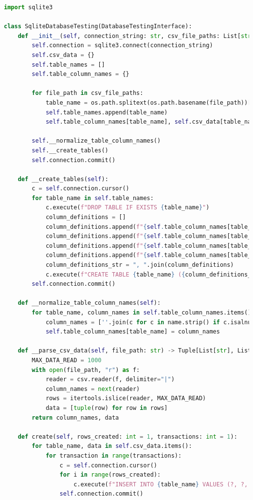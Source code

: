 \begin{lstlisting}[language=Python, caption=SQLiteDatabaseTesting]
import sqlite3

class SqliteDatabaseTesting(DatabaseTestingInterface):
    def __init__(self, connection_string: str, csv_file_paths: List[str]):
        self.connection = sqlite3.connect(connection_string)
        self.csv_data = {}
        self.table_names = []
        self.table_column_names = {}

        for file_path in csv_file_paths:
            table_name = os.path.splitext(os.path.basename(file_path))[0]
            self.table_names.append(table_name)
            self.table_column_names[table_name], self.csv_data[table_name] = self.__parse_csv_data(file_path)

        self.__normalize_table_column_names()
        self.__create_tables()
        self.connection.commit()

    def __create_tables(self):
        c = self.connection.cursor()
        for table_name in self.table_names:
            c.execute(f"DROP TABLE IF EXISTS {table_name}")
            column_definitions = []
            column_definitions.append(f"{self.table_column_names[table_name][0]} timestamp NOT NULL")
            column_definitions.append(f"{self.table_column_names[table_name][1]} timestamp NOT NULL")
            column_definitions.append(f"{self.table_column_names[table_name][2]} numerical NOT NULL")
            column_definitions.append(f"{self.table_column_names[table_name][3]} int")
            column_definitions_str = ", ".join(column_definitions)
            c.execute(f"CREATE TABLE {table_name} ({column_definitions_str})")
        self.connection.commit()

    def __normalize_table_column_names(self):
        for table_name, column_names in self.table_column_names.items():
            column_names = [''.join(c for c in name.strip() if c.isalnum() or c == '_') for name in column_names]
            self.table_column_names[table_name] = column_names

    def __parse_csv_data(self, file_path: str) -> Tuple[List[str], List[Tuple[str, str, float, int]]]:
        MAX_DATA_READ = 1000
        with open(file_path, "r") as f:
            reader = csv.reader(f, delimiter="|")
            column_names = next(reader)
            rows = itertools.islice(reader, MAX_DATA_READ)
            data = [tuple(row) for row in rows]
        return column_names, data

    def create(self, rows_created: int = 1, transactions: int = 1):
        for table_name, data in self.csv_data.items():
            for transaction in range(transactions):
                c = self.connection.cursor()
                for i in range(rows_created):
                    c.execute(f"INSERT INTO {table_name} VALUES (?, ?, ?, ?)", data[i+transaction*rows_created])
                self.connection.commit()


\end{lstlisting}
